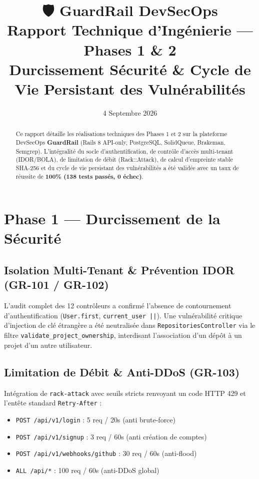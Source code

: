 \documentclass[11pt,a4paper]{article}
\title{\textbf{\Huge 🛡️ GuardRail DevSecOps}\\[0.3em] \Large Rapport Technique d'Ingénierie — Phases 1 \& 2\\Durcissement Sécurité \& Cycle de Vie Persistant des Vulnérabilités}
\date{4 Septembre 2026}
\begin{document}
\maketitle

\begin{abstract}
Ce rapport détaille les réalisations techniques des Phases 1 et 2 sur la plateforme DevSecOps \textbf{GuardRail} (Rails 8 API-only, PostgreSQL, SolidQueue, Brakeman, Semgrep). L'intégralité du socle d'authentification, de contrôle d'accès multi-tenant (IDOR/BOLA), de limitation de débit (Rack::Attack), de calcul d'empreinte stable SHA-256 et du cycle de vie persistant des vulnérabilités a été validée avec un taux de réussite de \textbf{100\% (138 tests passés, 0 échec)}.
\end{abstract}

\section{Phase 1 — Durcissement de la Sécurité}

\subsection{Isolation Multi-Tenant \& Prévention IDOR (GR-101 / GR-102)}
L'audit complet des 12 contrôleurs a confirmé l'absence de contournement d'authentification (\texttt{User.first}, \texttt{current\_user ||}). Une vulnérabilité critique d'injection de clé étrangère a été neutralisée dans \texttt{RepositoriesController} via le filtre \texttt{validate\_project\_ownership}, interdisant l'association d'un dépôt à un projet d'un autre utilisateur.

\subsection{Limitation de Débit \& Anti-DDoS (GR-103)}
Intégration de \texttt{rack-attack} avec seuils stricts renvoyant un code HTTP 429 et l'entête standard \texttt{Retry-After} :
\begin{itemize}
    \item \texttt{POST /api/v1/login} : 5 req / 20s (anti brute-force)
    \item \texttt{POST /api/v1/signup} : 3 req / 60s (anti création de comptes)
    \item \texttt{POST /api/v1/webhooks/github} : 30 req / 60s (anti-flood)
    \item \texttt{ALL /api/*} : 100 req / 60s (anti-DDoS global)
\end{itemize}
\end{document}
